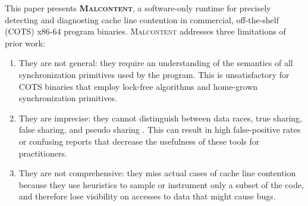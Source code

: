 \documentclass[letterpaper,twocolumn,10pt]{article}
\newcommand{\TextToolname}{Malcontent}
\newcommand{\Toolname}{\textsc{\TextToolname{}}}
\newcommand{\BoldToolname}{\textsc{\bf\TextToolname{}}}
\begin{document}

This paper presents \BoldToolname{}, a software-only runtime for precisely detecting and diagnosting cache line
contention in commercial, off-the-shelf (COTS) x86-64 program binaries. \Toolname{} addresses three limitations of prior
work: \begin{enumerate}
\item They are not general: they require an understanding of the semantics of all synchronization primitives used
by the program. This is unsatisfactory for COTS binaries that employ lock-free algorithms and home-grown synchronization
primitives.

\item They are imprecise: they cannot distinguish between data races, true sharing, false sharing, and pseudo sharing
\cite{DegenerateSharingAndFalseCoherence}. This can result in high false-positive rates or confusing reports that decrease
the usefulness of these tools for practitioners.

\item They are not comprehensive: they miss actual cases of cache line contention because they use heuristics to sample 
or instrument only a subset of the code, and therefore lose visibility on accesses to data that might cause bugs.




\end{enumerate}
\end{document}
